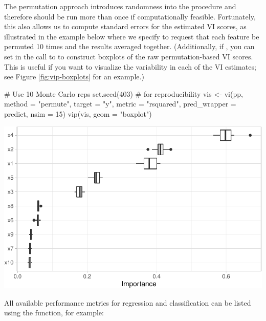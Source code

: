 The permutation approach introduces randomness into the procedure and
therefore should be run more than once if computationally feasible.
Fortunately, this also allows us to compute standard errors for the
estimated VI scores, as illustrated in the example below where we
specify  to request that each feature be permuted 10
times and the results averaged together. (Additionally, if
, you can set  in the call to
 to construct boxplots of the raw permutation-based VI
scores. This is useful if you want to visualize the variability in each
of the VI estimates; see Figure \ref{fig:vip-boxplots} for an example.)

\begin{Schunk}
\begin{Sinput}
# Use 10 Monte Carlo reps
set.seed(403)  # for reproducibility
vis <- vi(pp, method = "permute", target = "y", metric = "rsquared",
          pred_wrapper = predict, nsim = 15)
vip(vis, geom = "boxplot")
\end{Sinput}


\begin{center}\includegraphics[width=0.7\linewidth]{greenwell-boehmke_files/figure-latex/vip-boxplots-1} \end{center}

\end{Schunk}

All available performance metrics for regression and classification can
be listed using the  function, for example:

